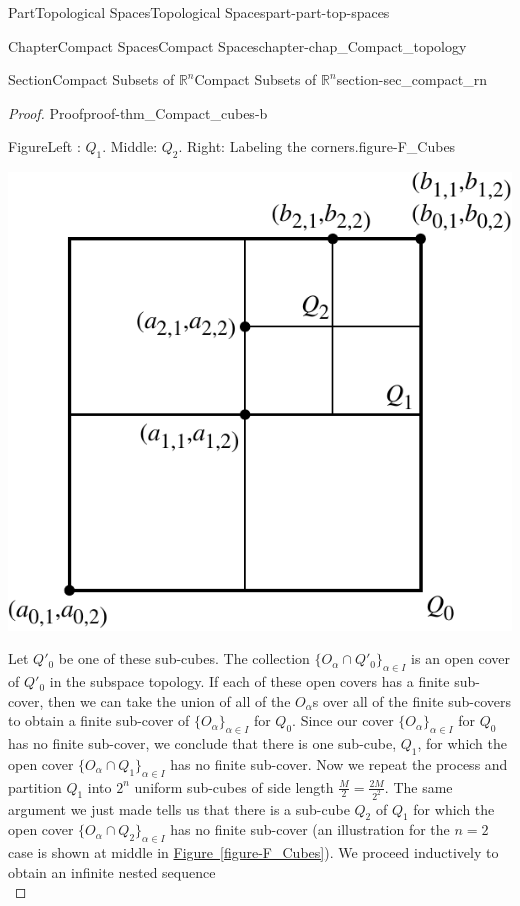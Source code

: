 \documentclass[oneside,10pt,]{book}
\newcommand{\xreffont}{\relax}
\numberwithin{equation}{chapter}
\newcommand{\R}{\mathbb{R}}
\begin{document}
\begin{partptx}{Part}{Topological Spaces}{}{Topological Spaces}{}{}{part-part-top-spaces}
\begin{chapterptx}{Chapter}{Compact Spaces}{}{Compact Spaces}{}{}{chapter-chap_Compact_topology}
\begin{sectionptx}{Section}{Compact Subsets of \(\R^n\)}{}{Compact Subsets of \(\R^n\)}{}{}{section-sec_compact_rn}
\begin{proof}{Proof}{}{proof-thm_Compact_cubes-b}
\begin{figureptx}{Figure}{Left : \(Q_1\). Middle: \(Q_2\). Right: Labeling the corners.}{figure-F_Cubes}{}
\begin{sidebyside}{3}{0}{0}{0}
\begin{sbspanel}{0.333333333333333}
\end{sbspanel}%
\begin{sbspanel}{0.333333333333333}%
\includegraphics[width=\linewidth]{external/HB_cube_3.pdf}
\end{sbspanel}%
\end{sidebyside}%
\tcblower
\end{figureptx}%
Let \(Q'_0\) be one of these sub-cubes. The collection \(\{O_{\alpha} \cap Q'_0\}_{\alpha \in I}\) is an open cover of \(Q'_0\) in the subspace topology. If each of these open covers has a finite sub-cover, then we can take the union of all of the \(O_{\alpha}\)s over all of the finite sub-covers to obtain a finite sub-cover of \(\{O_{\alpha}\}_{\alpha \in I}\) for \(Q_0\). Since our cover \(\{O_{\alpha}\}_{\alpha \in I}\) for \(Q_0\) has no finite sub-cover, we conclude that there is one sub-cube, \(Q_1\), for which the open cover \(\{O_{\alpha} \cap Q_1\}_{\alpha \in I}\) has no finite sub-cover. Now we repeat the process and partition \(Q_1\) into \(2^n\) uniform sub-cubes of side length \(\frac{M}{2}= \frac{2M}{2^2}\). The same argument we just made tells us that there is a sub-cube \(Q_2\) of \(Q_1\) for which the open cover \(\{O_{\alpha} \cap Q_2\}_{\alpha \in I}\) has no finite sub-cover (an illustration for the \(n=2\) case is shown at middle in \hyperref[figure-F_Cubes]{Figure~{\xreffont\ref{figure-F_Cubes}}}). We proceed inductively to obtain an infinite nested sequence%
\begin{equation*}

\end{equation*}
\end{proof}
\end{sectionptx}
\end{chapterptx}
\end{partptx}
\end{document}
